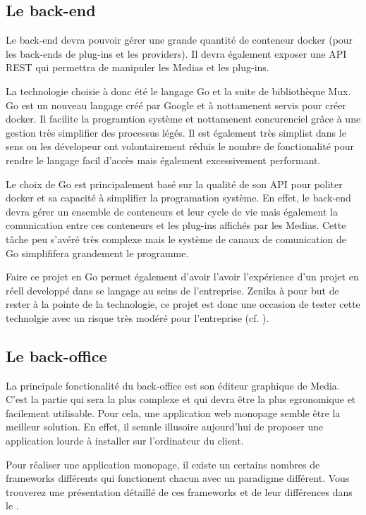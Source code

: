 \subsection{Le back-end}

  Le back-end devra pouvoir gérer une grande quantité de conteneur docker (pour les back-ends de plug-ins et les providers). Il devra également exposer une \gls{API} \gls{REST} qui permettra de manipuler les Medias et les plug-ins.

  La technologie choisie à donc été le langage \gls{Go} et la suite de bibliothèque \gls{Mux}. Go est un nouveau langage créé par Google et à nottamenent servis pour créer \gls{docker}. Il facilite la programtion système et nottamenent concurenciel grâce à une gestion très simplifier des processus légés. Il est également très simplist dans le sens ou les dévelopeur ont volontairement réduis le nombre de fonctionalité pour rendre le langage facil d'accès mais également excessivement performant.

  Le choix de Go est principalement basé sur la qualité de son \gls{API} pour politer \gls{docker} et sa capacité à simplifier la programation système. En effet, le back-end devra gérer un ensemble de conteneurs et leur cycle de vie mais également la comunication entre ces conteneurs et les plug-ins affichés par les Medias. Cette tâche peu s'avéré très complexe mais le système de canaux de comunication de Go simplififera grandement le programme.

  Faire ce projet en Go permet également d'avoir l'avoir l'expérience d'un projet en réell developpé dans se langage au seins de l'entreprise. Zenika à pour but de rester à la pointe de la technologie, ce projet est donc une occasion de tester cette technolgie avec un risque très modéré pour l'entreprise (cf. ).

\subsection{Le back-office}

  La principale fonctionalité du back-office est son éditeur graphique de Media. C'est la partie qui sera la plus complexe et qui devra être la plus egronomique et facilement utilisable. Pour cela, une application web monopage semble être la meilleur solution. En effet, il semnle illusoire aujourd'hui de proposer une application lourde à installer sur l'ordinateur du client.

  Pour réaliser une application monopage, il existe un certains nombres de \glspl{framework} différents qui fonctionent chacun avec un paradigme différent. Vous trouverez une présentation détaillé de ces \glspl{framework} et de leur différences dans le .

